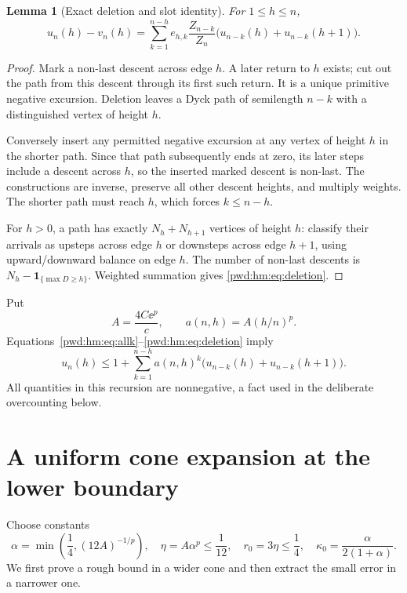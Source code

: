 \documentclass[11pt,letterpaper]{article}
\numberwithin{equation}{section}
\newtheorem{lemma}[theorem]{Lemma}
\theoremstyle{remark}\newtheorem{remark}[theorem]{Remark}
\begin{document}
\begin{lemma}[Exact deletion and slot identity]\label{pwd:hm:lem:deletion}
For $1\le h\le n$,
\begin{equation}\label{pwd:hm:eq:deletion}
 u_n(h)-v_n(h)=\sum_{k=1}^{n-h}e_{h,k}\frac{Z_{n-k}}{Z_n}
 \bigl(u_{n-k}(h)+u_{n-k}(h+1)\bigr).
\end{equation}
\end{lemma}
\begin{proof}
Mark a non-last descent across edge $h$. A later return to $h$ exists; cut out the path from this descent through its first such return. It is a unique primitive negative excursion. Deletion leaves a Dyck path of semilength $n-k$ with a distinguished vertex of height $h$.

Conversely insert any permitted negative excursion at any vertex of height $h$ in the shorter path. Since that path subsequently ends at zero, its later steps include a descent across $h$, so the inserted marked descent is non-last. The constructions are inverse, preserve all other descent heights, and multiply weights. The shorter path must reach $h$, which forces $k\le n-h$.

For $h>0$, a path has exactly $N_h+N_{h+1}$ vertices of height $h$: classify their arrivals as upsteps across edge $h$ or downsteps across edge $h+1$, using upward/downward balance on edge $h$. The number of non-last descents is $N_h-\mathbf1_{\{\max D\ge h\}}$. Weighted summation gives \eqref{pwd:hm:eq:deletion}.
\end{proof}
Put
\begin{equation}\label{pwd:hm:eq:A-a}
 A=\frac{4C\ee^p}{c},\qquad a(n,h)=A(h/n)^p.
\end{equation}
Equations~\eqref{pwd:hm:eq:allk}--\eqref{pwd:hm:eq:deletion} imply
\begin{equation}\label{pwd:hm:eq:cone-recursion}
 u_n(h)\le1+\sum_{k=1}^{n-h}a(n,h)^k
 \bigl(u_{n-k}(h)+u_{n-k}(h+1)\bigr).
\end{equation}
All quantities in this recursion are nonnegative, a fact used in the deliberate overcounting below.

\section{A uniform cone expansion at the lower boundary}\label{pwd:hm:sec:cone}
Choose constants
\begin{equation}\label{pwd:hm:eq:cone-constants}
 \alpha=\min\left(\frac14,(12A)^{-1/p}\right),\quad
 \eta=A\alpha^p\le\frac1{12},\quad r_0=3\eta\le\frac14,\quad
 \kappa_0=\frac{\alpha}{2(1+\alpha)}.
\end{equation}
We first prove a rough bound in a wider cone and then extract the small error in a narrower one.
\end{document}
